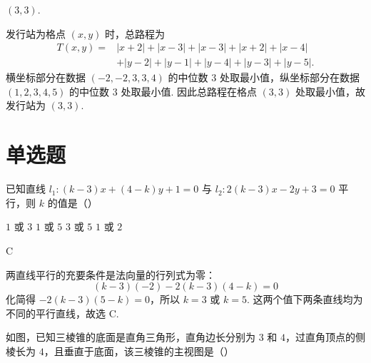 \begin{answer}
\((3,3)\).
\end{answer}

\begin{solution}
发行站为格点 \((x,y)\) 时，总路程为
\[
\begin{aligned}
T(x,y)={}&|x+2|+|x-3|+|x-3|+|x+2|+|x-4|\\
&+|y-2|+|y-1|+|y-4|+|y-3|+|y-5|.
\end{aligned}
\]
横坐标部分在数据 \((-2,-2,3,3,4)\) 的中位数 \(3\) 处取最小值，纵坐标部分在数据 \((1,2,3,4,5)\) 的中位数 \(3\) 处取最小值. 因此总路程在格点 \((3,3)\) 处取最小值，故发行站为 \((3,3)\).
\end{solution}

\section{单选题}

\begin{problem}
已知直线 \(l_1: (k - 3)x + (4 - k)y + 1 = 0\) 与 \(l_2: 2(k - 3)x - 2y + 3 = 0\) 平行，则 \(k\) 的值是（\quad）

\choices
    {\(1\) 或 \(3\)}
    {\(1\) 或 \(5\)}
    {\(3\) 或 \(5\)}
    {\(1\) 或 \(2\)}
\end{problem}

\begin{answer}
C
\end{answer}

\begin{solution}
两直线平行的充要条件是法向量的行列式为零：
\[
(k-3)(-2)-2(k-3)(4-k)=0
\]
化简得 \(-2(k-3)(5-k)=0\)，所以 \(k=3\) 或 \(k=5\). 这两个值下两条直线均为不同的平行直线，故选 C.
\end{solution}

\begin{problem}
如图，已知三棱锥的底面是直角三角形，直角边长分别为 \(3\) 和 \(4\)，过直角顶点的侧棱长为 \(4\)，且垂直于底面，该三棱锥的主视图是（\quad）


    {}
    {}
    {}
\end{problem}

